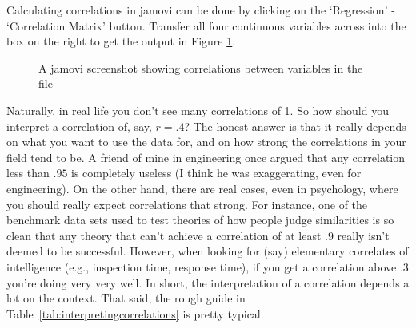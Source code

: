 
Calculating correlations in jamovi can be done by clicking on the `Regression' - `Correlation Matrix' button. Transfer all four continuous variables across into the box on the right to get the output in Figure \ref{fig:correlations}.

\vspace{1cm}
\begin{figure}[!htb]
\begin{center}
\caption{A jamovi screenshot showing correlations between variables in the  file}
\label{fig:correlations}
\HR
\end{center}
\end{figure}

 
Naturally, in real life you don't see many correlations of 1. So how should you interpret a correlation of, say, $r= .4$? The honest answer is that it really depends on what you want to use the data for, and on how strong the correlations in your field tend to be. A  friend of mine in engineering once argued that any correlation less than $.95$ is completely useless (I think he was exaggerating, even for engineering). On the other hand, there are real cases, even in psychology, where you should really expect correlations that strong. For instance, one of the benchmark data sets used to test theories of how people judge similarities is so clean that any theory that can't achieve a correlation of at least $.9$ really isn't deemed to be successful. However, when looking for (say) elementary correlates of intelligence (e.g., inspection time, response time), if you get a correlation above $.3$ you're doing very very well. In short, the interpretation of a correlation depends a lot on the context. That said, the rough guide in Table~\ref{tab:interpretingcorrelations} is pretty typical.

